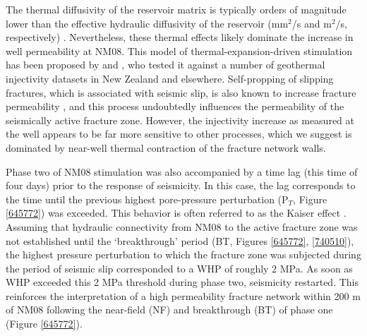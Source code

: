 The thermal diffusivity of the reservoir matrix is typically orders of magnitude lower than the effective hydraulic diffusivity of the reservoir (mm$^2$/s and m$^2$/s, respectively) \citep{Kanamori_1968,Shapiro_2002}. Nevertheless, these thermal effects likely dominate the increase in well permeability at NM08. This model of thermal-expansion-driven stimulation has been proposed by \citet{grant2013thermal} and \citet{siega_2014}, who tested it against a number of geothermal injectivity datasets in New Zealand and elsewhere. Self-propping of slipping fractures, which is associated with seismic slip, is also known to increase fracture permeability \citep[e.g.][]{Lee_2002}, and this process undoubtedly influences the permeability of the seismically active fracture zone. However, the injectivity increase as measured at the well appears to be far more sensitive to other processes, which we suggest is dominated by near-well thermal contraction of the fracture network walls.

Phase two of NM08 stimulation was also accompanied by a time lag (this time of four days) prior to the response of seismicity. In this case, the lag corresponds to the time until the previous highest pore-pressure perturbation (P$_T$, Figure \ref{645772}) was exceeded. This behavior is often referred to as the Kaiser effect \citep{Holcomb_1993}. Assuming that hydraulic connectivity from NM08 to the active fracture zone was not established until the `breakthrough' period (BT, Figures \ref{645772}, \ref{740510}), the highest pressure perturbation to which the fracture zone was subjected during the period of seismic slip corresponded to a WHP of roughly 2 MPa. As soon as WHP exceeded this 2 MPa threshold during phase two, seismicity restarted. This reinforces the interpretation of a high permeability fracture network within 200 m of NM08 following the near-field (NF) and breakthrough (BT) of phase one (Figure \ref{645772}).

